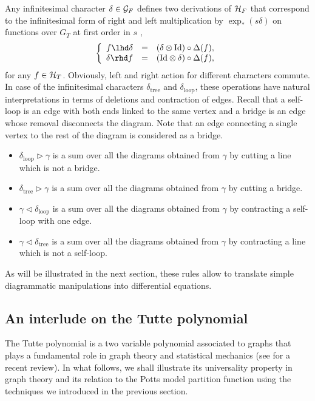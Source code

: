 \documentclass[12pt,here,feynmf]{article}
\begin{document}
Any infinitesimal character $\delta\in{\cal G}_{F}$ defines two derivations of ${\cal H}_{F}$ that correspond to the infinitesimal form of right and left multiplication by $\exp_{\ast}(s\delta)$ on functions over $G_{T}$ at first order in $s$ ,
\begin{equation}
\left\{
\begin{array}{rcl}
f\lhd\delta&=&\left(\delta\otimes\mathrm{Id}\right)\circ\Delta(f),\cr
\delta\rhd f&=&\left(\mathrm{Id}\otimes\delta\right)\circ\Delta(f),
\end{array}
\right.
\end{equation}
for any $f\in{\cal H}_{T}$. Obviously, left and right action for different characters commute. In case of the infinitesimal characters $\delta_{\mathrm{tree}}$ and $\delta_{\mathrm{loop}}$, these operations have natural interpretations in terms of deletions and contraction of edges.  Recall that a self-loop is an edge with both ends linked to the same vertex and a bridge is an edge whose removal disconnects the diagram. Note that an edge connecting a single vertex to the rest of the diagram is considered as a bridge.
\begin{itemize}
\item
$\delta_{\mathrm{loop}}\rhd\gamma$ is a sum over all the diagrams obtained from $\gamma$ by cutting a line which is not a bridge. 
\item
$\delta_{\mathrm{tree}}\rhd\gamma$ is a sum over all the diagrams obtained from $\gamma$ by cutting 
a bridge.
\item
$\gamma\lhd\delta_{\mathrm{loop}}$ is a sum over all the diagrams obtained from $\gamma$ by contracting a self-loop with one edge.
\item
$\gamma\lhd\delta_{\mathrm{tree}}$ is a sum over all the diagrams obtained from $\gamma$ by contracting a line which is not a self-loop.
\end{itemize} 

As will be illustrated in the next section, these rules allow to translate simple diagrammatic manipulations into differential equations.  
 
 \label{diffrelations}

\subsection{An interlude on the Tutte polynomial}
 
The Tutte polynomial is a two variable polynomial associated to graphs that plays a fundamental role in graph theory and statistical mechanics (see \cite{tutte} for a recent review). In what follows, we shall illustrate its universality property in graph theory and its relation to the Potts model partition function using the techniques we introduced in the previous section.
\end{document}
